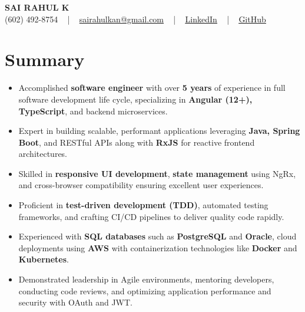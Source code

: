\documentclass[letterpaper,11pt]{article}
\newcommand{\resumeItem}[1]{
  \item\footnotesize{
    {#1 \vspace{-2pt}}
  }
}
\newcommand{\resumeItemListStart}{\begin{itemize}[leftmargin=*]}
\newcommand{\resumeItemListEnd}{\end{itemize}\vspace{-5pt}}
\begin{document}
\begin{center}
    {\fontsize{14pt}{12pt}\selectfont \textbf{\MakeUppercase{Sai Rahul K}}}\\ \vspace{2pt}
    \fontsize{10pt}{12pt}\selectfont (602) 492-8754 ~ | ~ \href{mailto:sairahulkan@gmail.com}{sairahulkan@gmail.com} ~ | ~
    \href{https://www.linkedin.com/in/rq123/}{\color{blue}\underline{LinkedIn}} ~ | ~
    \href{https://github.com/kanrahuldo}{\color{blue}\underline{GitHub}}~
    \vspace{-8pt}
\end{center}

\section{Summary}
\fontsize{9pt}{10pt}\selectfont
\resumeItemListStart
    \resumeItem{Accomplished \textbf{software engineer} with over \textbf{5 years} of experience in full software development life cycle, specializing in \textbf{Angular (12+), TypeScript}, and backend microservices.} \vspace{-3pt}
    \resumeItem{Expert in building scalable, performant applications leveraging \textbf{Java, Spring Boot}, and RESTful APIs along with \textbf{RxJS} for reactive frontend architectures.} \vspace{-3pt}
    \resumeItem{Skilled in \textbf{responsive UI development}, \textbf{state management} using NgRx, and cross-browser compatibility ensuring excellent user experiences.} \vspace{-3pt}
    \resumeItem{Proficient in \textbf{test-driven development (TDD)}, automated testing frameworks, and crafting CI/CD pipelines to deliver quality code rapidly.} \vspace{-3pt}
    \resumeItem{Experienced with \textbf{SQL databases} such as \textbf{PostgreSQL} and \textbf{Oracle}, cloud deployments using \textbf{AWS} with containerization technologies like \textbf{Docker} and \textbf{Kubernetes}.} \vspace{-3pt}
    \resumeItem{Demonstrated leadership in Agile environments, mentoring developers, conducting code reviews, and optimizing application performance and security with OAuth and JWT.} \vspace{-3pt}
\resumeItemListEnd
\vspace{-6pt}
\end{document}
